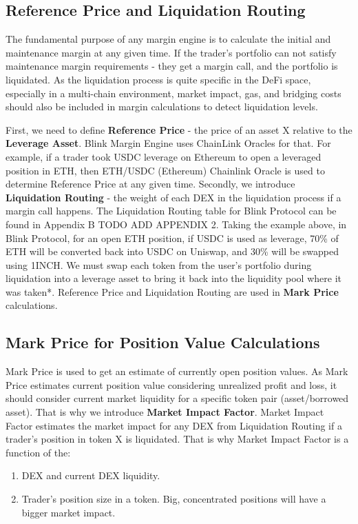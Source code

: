 \documentclass[conference]{IEEEtran}
\begin{document}
\subsection{Reference Price and Liquidation Routing}
The fundamental purpose of any margin engine is to calculate the initial and maintenance margin at any given time. If the trader's portfolio can not satisfy maintenance margin requirements -  they get a margin call, and the portfolio is liquidated. As the liquidation process is quite specific in the DeFi space, especially in a multi-chain environment, market impact, gas, and bridging costs should also be included in margin calculations to detect liquidation levels.

First, we need to define \textbf {Reference Price} - the price of an asset X relative to the \textbf{Leverage Asset}. Blink Margin Engine uses ChainLink Oracles for that. For example, if a trader took USDC leverage on Ethereum to open a leveraged position in ETH, then ETH/USDC (Ethereum) Chainlink Oracle is used to determine Reference Price at any given time. Secondly, we introduce \textbf {Liquidation Routing} - the weight of each DEX in the liquidation process if a margin call happens. The Liquidation Routing table for Blink Protocol can be found in Appendix B TODO ADD APPENDIX 2. Taking the example above, in Blink Protocol, for an open ETH position, if USDC is used as leverage, 70\% of ETH will be converted back into USDC on Uniswap, and 30\% will be swapped using 1INCH. We must swap each token from the user's portfolio during liquidation into a leverage asset to bring it back into the liquidity pool where it was taken*. Reference Price and Liquidation Routing are used in \textbf{Mark Price} calculations.

\thispagestyle{fancy}

\subsection{Mark Price for Position Value Calculations}

Mark Price is used to get an estimate of currently open position values. As Mark Price estimates current position value considering unrealized profit and loss, it should consider current market liquidity for a specific token pair (asset/borrowed asset). That is why we introduce \textbf{Market Impact Factor}. Market Impact Factor estimates the market impact for any DEX from Liquidation Routing if a trader's position in token X is liquidated. That is why Market Impact Factor is a function of the:
  \begin{enumerate}
  \item DEX and current DEX liquidity.
  \item Trader's position size in a token. Big, concentrated positions will have a bigger market impact. 	
  \end{enumerate}
\end{document}
